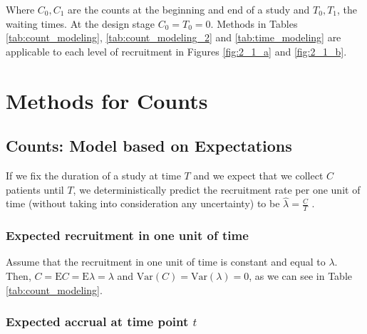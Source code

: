 

Where $C_0, C_1$ are the counts at the beginning and end of a study and $T_0, T_1$, the waiting times. At the design stage $C_0=T_0=0$. Methods in Tables \ref{tab:count_modeling}, \ref{tab:count_modeling_2} and \ref{tab:time_modeling} are applicable to each level of recruitment in Figures \ref{fig:2_1_a} and \ref{fig:2_1_b}.

\chapter{Methods for Counts} 
\section{Counts: Model based on Expectations}
\label{sec:expect}

If we fix the duration of a study at time $T$ and we expect that we collect $C$ patients until $T$, we deterministically predict the recruitment rate per one unit of time (without taking into consideration any uncertainty) to be $\hat{\lambda}=\frac{C}{T}$ \citep{carter2004application}. 




\subsection{Expected recruitment in one unit of time}

Assume that the recruitment in one unit of time is constant and equal to $\lambda$. Then, $C = \textrm{E}C = \textrm{E}\lambda = \lambda$ and $\textrm{Var}(C) = \textrm{Var}(\lambda) = 0$, as we can see in Table \ref{tab:count_modeling}.

\subsection{Expected accrual at time point $t$}

